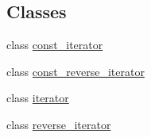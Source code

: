 \subsection*{Classes}
\begin{DoxyCompactItemize}
\item 
class \hyperlink{classINMOST_1_1Storage_1_1reference__array_1_1const__iterator}{const\-\_\-iterator}
\item 
class \hyperlink{classINMOST_1_1Storage_1_1reference__array_1_1const__reverse__iterator}{const\-\_\-reverse\-\_\-iterator}
\item 
class \hyperlink{classINMOST_1_1Storage_1_1reference__array_1_1iterator}{iterator}
\item 
class \hyperlink{classINMOST_1_1Storage_1_1reference__array_1_1reverse__iterator}{reverse\-\_\-iterator}
\end{DoxyCompactItemize}
